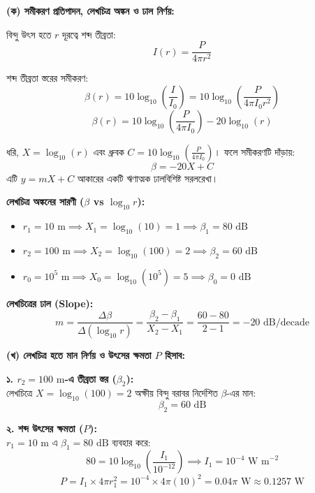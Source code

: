 \documentclass[12pt, a4paper]{article}
\begin{document}
\begin{tcolorbox}[solutionbox={সমাধান (Solution)}]
\noindent
\textbf{(ক) সমীকরণ প্রতিপাদন, লেখচিত্র অঙ্কন ও ঢাল নির্ণয়:}

\vspace{0.5em}
\noindent
বিন্দু উৎস হতে $r$ দূরত্বে শব্দ তীব্রতা:
\[ I(r) = \frac{P}{4\pi r^2} \]

\noindent
শব্দ তীব্রতা স্তরের সমীকরণ:
\[ \beta(r) = 10 \log_{10}\left(\frac{I}{I_0}\right) = 10 \log_{10}\left(\frac{P}{4\pi I_0 r^2}\right) \]
\[ \beta(r) = 10 \log_{10}\left(\frac{P}{4\pi I_0}\right) - 20 \log_{10}(r) \]

\noindent
ধরি, $X = \log_{10}(r)$ এবং ধ্রুবক $C = 10 \log_{10}\left(\frac{P}{4\pi I_0}\right)$। ফলে সমীকরণটি দাঁড়ায়:
\[ \beta = -20 X + C \]
এটি $y = mX + C$ আকারের একটি ঋণাত্মক ঢালবিশিষ্ট সরলরেখা।

\vspace{0.5em}
\noindent
\textbf{লেখচিত্র অঙ্কনের সারণী ($\beta$ vs $\log_{10}r$):}
\begin{itemize}[leftmargin=2em, itemsep=0.2em]
    \item $r_1 = 10\text{ m} \implies X_1 = \log_{10}(10) = 1 \implies \beta_1 = 80\text{ dB}$
    \item $r_2 = 100\text{ m} \implies X_2 = \log_{10}(100) = 2 \implies \beta_2 = 60\text{ dB}$
    \item $r_0 = 10^5\text{ m} \implies X_0 = \log_{10}(10^5) = 5 \implies \beta_0 = 0\text{ dB}$
\end{itemize}

\vspace{0.3em}
\noindent
\textbf{লেখচিত্রের ঢাল (Slope):}
\[ m = \frac{\Delta \beta}{\Delta (\log_{10} r)} = \frac{\beta_2 - \beta_1}{X_2 - X_1} = \frac{60 - 80}{2 - 1} = -20\text{ dB/decade} \]

\vspace{1em}
\noindent
\textbf{(খ) লেখচিত্র হতে মান নির্ণয় ও উৎসের ক্ষমতা $P$ হিসাব:}

\vspace{0.5em}
\noindent
\textbf{১. $r_2 = 100\text{ m}$-এ তীব্রতা স্তর ($\beta_2$):} \\
লেখচিত্রে $X = \log_{10}(100) = 2$ অক্ষীয় বিন্দু বরাবর নির্দেশিত $\beta$-এর মান:
\[ \beta_2 = 60\text{ dB} \]

\noindent
\textbf{২. শব্দ উৎসের ক্ষমতা ($P$):} \\
$r_1 = 10\text{ m}$ এ $\beta_1 = 80\text{ dB}$ ব্যবহার করে:
\[ 80 = 10 \log_{10}\left(\frac{I_1}{10^{-12}}\right) \implies I_1 = 10^{-4}\text{ W m}^{-2} \]
\[ P = I_1 \times 4\pi r_1^2 = 10^{-4} \times 4\pi (10)^2 = 0.04\pi\text{ W} \approx 0.1257\text{ W} \]


\end{tcolorbox}
\end{document}
